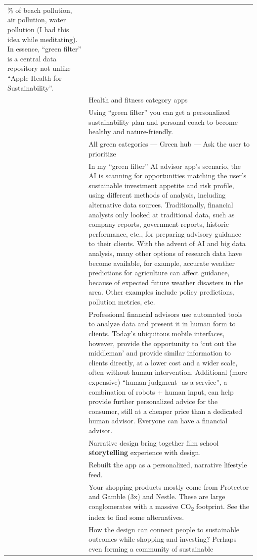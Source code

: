 \documentclass[
  letterpaper,
  DIV=11,
  numbers=noendperiod]{scrartcl}
\begin{document}
\begin{longtable}[]{@{}
  >{\raggedright\arraybackslash}p{}
  >{\raggedright\arraybackslash}p{}@{}}
\% of beach pollution, air pollution, water pollution (I had this idea
while meditating). In essence, ``green filter'' is a central data
repository not unlike ``Apple Health for Sustainability''. \\
& Health and fitness category apps \\
& Using ``green filter'' you can get a personalized sustainability plan
and personal coach to become healthy and nature-friendly. \\
& All green categories --- Green hub --- Ask the user to prioritize \\
& In my ``green filter'' AI advisor app's scenario, the AI is scanning
for opportunities matching the user's sustainable investment appetite
and risk profile, using different methods of analysis, including
alternative data sources. Traditionally, financial analysts only looked
at traditional data, such as company reports, government reports,
historic performance, etc., for preparing advisory guidance to their
clients. With the advent of AI and big data analysis, many other options
of research data have become available, for example, accurate weather
predictions for agriculture can affect guidance, because of expected
future weather disasters in the area. Other examples include policy
predictions, pollution metrics, etc. \\
& Professional financial advisors use automated tools to analyze data
and present it in human form to clients. Today's ubiquitous mobile
interfaces, however, provide the opportunity to `cut out the middleman'
and provide similar information to clients directly, at a lower cost and
a wider scale, often without human intervention. Additional (more
expensive) ``human-judgment- as-a-service'', a combination of robots +
human input, can help provide further personalized advice for the
consumer, still at a cheaper price than a dedicated human advisor.
Everyone can have a financial advisor. \\
& Narrative design bring together film school \textbf{storytelling}
experience with design. \\
& Rebuilt the app as a personalized, narrative lifestyle feed. \\
& Your shopping products mostly come from Protector and Gamble (3x) and
Nestle. These are large conglomerates with a massive CO\textsubscript{2}
footprint. See the index to find some alternatives. \\
& How the design can connect people to sustainable outcomes while
shopping and investing? Perhaps even forming a community of sustainable

\end{longtable}
\end{document}
